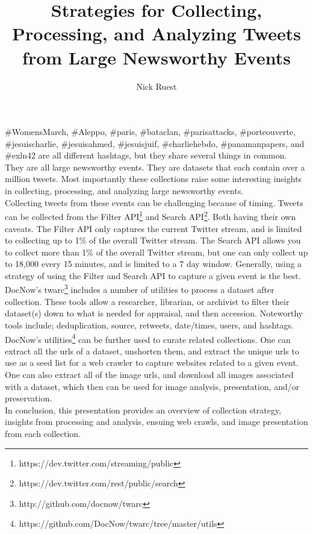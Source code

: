 \documentclass[sigconf]{acmart}
\begin{document}
\title{Strategies for Collecting, Processing, and Analyzing Tweets from Large Newsworthy Events}

\author{Nick Ruest}



\maketitle

\#WomensMarch, \#Aleppo, \#paris, \#bataclan, \#parisattacks, \#porteouverte, \#jesuischarlie, \#jesuisahmed, \#jesuisjuif, \#charliehebdo, \#panamanpapers, and \#exln42 are all different hashtags, but they share several things in common. They are all large newsworthy events. They are datasets that each contain over a million tweets. Most importantly these collections raise some interesting insights in collecting, processing, and analyzing large newsworthy events\cite{Milligan_etal_JCDL2016}.\\
 
Collecting tweets from these events can be challenging because of timing. Tweets can be collected from the Filter API\footnote{https://dev.twitter.com/streaming/public} and Search API\footnote{https://dev.twitter.com/rest/public/search}. Both having their own caveats. The Filter API only captures the current Twitter stream, and is limited to collecting up to 1\% of the overall Twitter stream. The Search API allows you to collect more than 1\% of the overall Twitter stream\cite{Driscoll_etal_IJC2014}, but one can only collect up to 18,000 every 15 minutes, and is limited to a 7 day window. Generally, using a strategy of using the Filter and Search API to capture a given event is the best.\\
 
DocNow's twarc\footnote{http://github.com/docnow/twarc} includes a number of utilities to process a dataset after collection. These tools allow a researcher, librarian, or archivist to filter their dataset(s) down to what is needed for appraisal, and then accession. Noteworthy tools include; deduplication, source, retweets, date/times, users, and hashtags.\\
 
DocNow's utilities\footnote{https://github.com/DocNow/twarc/tree/master/utils} can be further used to curate related collections. One can extract all the urls of a dataset, unshorten them, and extract the unique urls to use as a seed list for a web crawler to capture websites related to a given event. One can also extract all of the image urls, and download all images associated with a dataset, which then can be used for image analysis\cite{ruest_2016}, presentation, and/or preservation.\\
 
In conclusion, this presentation provides an overview of collection strategy, insights from processing and analysis, ensuing web crawls, and image presentation from each collection.\\


 
\end{document}
